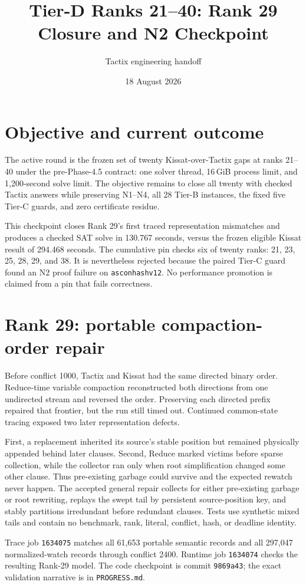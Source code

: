 \documentclass[11pt]{article}
\title{Tier-D Ranks 21--40: Rank 29 Closure and N2 Checkpoint}
\author{Tactix engineering handoff}
\date{18 August 2026}
\newcommand{\code}[1]{\texttt{#1}}
\begin{document}
\maketitle

\section*{Objective and current outcome}
The active round is the frozen set of twenty Kissat-over-Tactix gaps at ranks
21--40 under the pre-Phase-4.5 contract: one solver thread, 16\,GiB process
limit, and 1,200-second solve limit. The objective remains to close all twenty
with checked Tactix answers while preserving N1--N4, all 28 Tier-B instances,
the fixed five Tier-C guards, and zero certificate residue.

This checkpoint closes Rank 29's first traced representation mismatches and
produces a checked SAT solve in 130.767 seconds, versus the frozen eligible
Kissat result of 294.468 seconds. The cumulative pin checks six of twenty
ranks: 21, 23, 25, 28, 29, and 38. It is nevertheless rejected because the
paired Tier-C guard found an N2 proof failure on \code{asconhashv12}. No
performance promotion is claimed from a pin that fails correctness.

\section*{Rank 29: portable compaction-order repair}
Before conflict 1000, Tactix and Kissat had the same directed binary order.
Reduce-time variable compaction reconstructed both directions from one
undirected stream and reversed the order. Preserving each directed prefix
repaired that frontier, but the run still timed out. Continued common-state
tracing exposed two later representation defects.

First, a replacement inherited its source's stable position but remained
physically appended behind later clauses. Second, Reduce marked victims before
sparse collection, while the collector ran only when root simplification
changed some other clause. Thus pre-existing garbage could survive and the
expected rewatch never happen. The accepted general repair collects for either
pre-existing garbage or root rewriting, replays the swept tail by persistent
source-position key, and stably partitions irredundant before redundant
clauses. Tests use synthetic mixed tails and contain no benchmark, rank,
literal, conflict, hash, or deadline identity.

Trace job \code{1634075} matches all 61,653 portable semantic records and all
297,047 normalized-watch records through conflict 2400. Runtime job
\code{1634074} checks the resulting Rank-29 model. The code checkpoint is
commit \code{9869a43}; the exact validation narrative is in \code{PROGRESS.md}.
\end{document}
